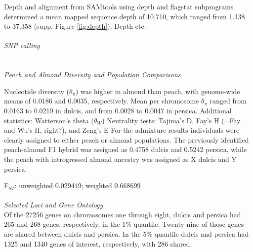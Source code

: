 \documentclass[12pt]{article}
\begin{document}
Depth and alignment from SAMtools using depth and flagstat subprograms \citep{li2009sequence} determined a mean mapped sequence depth of 10.710, which ranged from 1.138 to 37.358 (supp. Figure \ref{fig:depth}).
%
%
Depth etc.\\
%
\\
\emph{SNP calling}\\
\\
%
\\
\emph{Peach and Almond Diversity and Population Comparisons}

Nucleotide diversity ($\theta_{\pi}$) was higher in almond than peach, with genome-wide means of 0.0186 and 0.0035, respectively. 
%
Mean per chromosome $\theta_{\pi}$ ranged from 0.0163 to 0.0219 in dulcis, and from 0.0028 to 0.0047 in persica.
Additional statistics: Watterson's theta ($\theta_{W}$)
Neutrality tests: Tajima's D, Fay's H (=Fay and Wu's H, right?), and Zeng's E
For the admixture results individuals were clearly assigned to either peach or almond populations. 
%
The previously identified peach-almond F1 hybrid was assigned as 0.4758 dulcis and 0.5242 persica, while the peach with introgressed almond ancestry was assigned as X dulcis and Y persica.
%

F$_{ST}$: unweighted 0.029449; weighted 0.668699
\\
%
\\
\emph{Selected Loci and Gene Ontology}\\
Of the 27256 genes on chromosomes one through eight, dulcis and persica had 265 and 268 genes, respectively, in the 1\% quantile. 
%
Twenty-nine of those genes are shared between dulcis and persica.
%
In the 5\% quantile dulcis and persica had 1325 and 1340 genes of interest, respectively, with 286 shared.
\\
\end{document}

